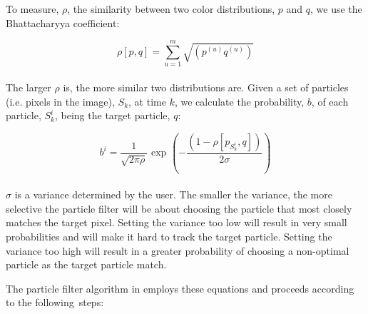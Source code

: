 \documentclass[11pt]{article}
\begin{document}
To measure, $\rho$, the similarity between two color distributions, $p$ and $q$, we use the Bhattacharyya coefficient:

\begin{equation}
\rho[p,q] = \sum^m_{u=1} \sqrt{ (p^{(u)} q^{(u)}) } 
\label{eq:bcoeff}
\end{equation} \\

The larger $\rho$ is, the more similar two distributions are. Given a set of particles (i.e. pixels in the image), $S_k$, at time $k$, we calculate the probability, $b$, of each particle, $S^i_k$, being the target particle, $q$:

\begin{equation}
b^i = \frac{1}{\sqrt{2\pi\rho}} \text{ exp } \left ( - \frac{(1-\rho[p_{S_k^i},q])}{2\sigma} \right )
\label{eq:bprob}
\end{equation} \\

$\sigma$ is a variance determined by the user. The smaller the variance, the more selective the particle filter will be about choosing the particle that most closely matches the target pixel. Setting the variance too low will result in very small probabilities and will make it hard to track the target particle. Setting the variance too high will result in a greater probability of choosing a non-optimal particle as the target particle match. 

The particle filter algorithm in \cite{particle} employs these equations and proceeds according to the \mbox{following steps}:
\end{document}
